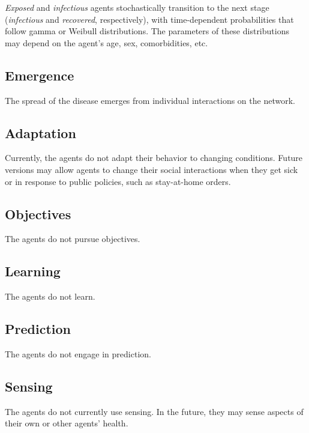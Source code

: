 \documentclass[nofonts,]{tufte-handout}
\begin{document}
\emph{Exposed} and \emph{infectious} agents stochastically transition to
the next stage (\emph{infectious} and \emph{recovered}, respectively),
with time-dependent probabilities that follow gamma or Weibull
distributions. The parameters of these distributions may depend on the
agent's age, sex, comorbidities, etc.

\hypertarget{emergence}{%
\subsection{Emergence}\label{emergence}}

The spread of the disease emerges from individual interactions on the
network.

\hypertarget{adaptation}{%
\subsection{Adaptation}\label{adaptation}}

Currently, the agents do not adapt their behavior to changing
conditions. Future versions may allow agents to change their social
interactions when they get sick or in response to public policies, such
as stay-at-home orders.

\hypertarget{objectives}{%
\subsection{Objectives}\label{objectives}}

The agents do not pursue objectives.

\hypertarget{learning}{%
\subsection{Learning}\label{learning}}

The agents do not learn.

\hypertarget{prediction}{%
\subsection{Prediction}\label{prediction}}

The agents do not engage in prediction.

\hypertarget{sensing}{%
\subsection{Sensing}\label{sensing}}

The agents do not currently use sensing. In the future, they may sense
aspects of their own or other agents' health.
\end{document}

